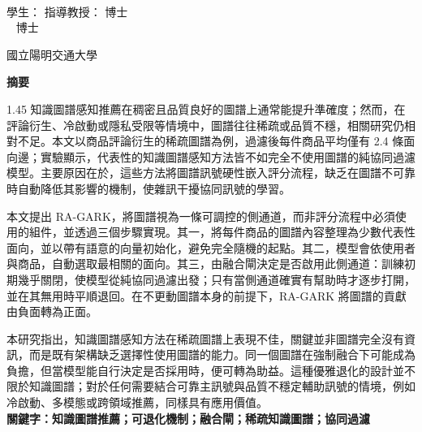 \begin{center}
    \large
    \begin{singlespace}    
        \textbf{\chineseTitle{}} \\[0.5cm]
    \end{singlespace}

    \begin{singlespace}    
    學生：\studentCnName  \hspace{2.5cm}  指導教授：\advisorCnName \hspace{0.1cm} 博士 \\

    \ifdefined\advisorCnNameB %
        \hspace{9.6cm}  \advisorCnNameB ~ 博士 \\
    \fi
    \end{singlespace}

    \vspace{0.5cm}

    \begin{singlespace}
        國立陽明交通大學\NameofDepartmentInstituteCN\\[0.2cm]
    \end{singlespace}

    \textbf{摘\hspace{1cm}要} \\[0.5cm]

\end{center}

\normalsize

\begin{spacing}{1.45}
知識圖譜感知推薦在稠密且品質良好的圖譜上通常能提升準確度；然而，在評論衍生、冷啟動或隱私受限等情境中，圖譜往往稀疏或品質不穩，相關研究仍相對不足。本文以商品評論衍生的稀疏圖譜為例，過濾後每件商品平均僅有 2.4 條面向邊；實驗顯示，代表性的知識圖譜感知方法皆不如完全不使用圖譜的純協同過濾模型。主要原因在於，這些方法將圖譜訊號硬性嵌入評分流程，缺乏在圖譜不可靠時自動降低其影響的機制，使雜訊干擾協同訊號的學習。

本文提出 RA-GARK，將圖譜視為一條可調控的側通道，而非評分流程中必須使用的組件，並透過三個步驟實現。其一，將每件商品的圖譜內容整理為少數代表性面向，並以帶有語意的向量初始化，避免完全隨機的起點。其二，模型會依使用者與商品，自動選取最相關的面向。其三，由融合閘決定是否啟用此側通道：訓練初期幾乎關閉，使模型從純協同過濾出發；只有當側通道確實有幫助時才逐步打開，並在其無用時平順退回。在不更動圖譜本身的前提下，RA-GARK 將圖譜的貢獻由負面轉為正面。

本研究指出，知識圖譜感知方法在稀疏圖譜上表現不佳，關鍵並非圖譜完全沒有資訊，而是既有架構缺乏選擇性使用圖譜的能力。同一個圖譜在強制融合下可能成為負擔，但當模型能自行決定是否採用時，便可轉為助益。這種優雅退化的設計並不限於知識圖譜；對於任何需要結合可靠主訊號與品質不穩定輔助訊號的情境，例如冷啟動、多模態或跨領域推薦，同樣具有應用價值。\\[0.5\baselineskip]
\textbf{關鍵字：知識圖譜推薦；可退化機制；融合閘；稀疏知識圖譜；協同過濾}
\end{spacing}
